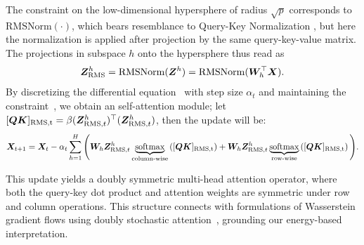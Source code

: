 The constraint on the low-dimensional hypersphere of radius $\sqrt{p}$ corresponds to $\operatorname{RMSNorm(\cdot)}$, which bears resemblance to Query-Key Normalization \citep{henry-etal-2020-query}, but here the normalization is applied after projection by the same query-key-value matrix. The projections in subspace $h$ onto the hypersphere thus read as 
\begin{equation}
\label{eq:7}
{\bm{Z}}_{\text{RMS}}^h = \operatorname{RMSNorm}({\bm{Z}}^h) = \operatorname{RMSNorm}({\bm{W}}_h^\top{\bm{X}}).
\end{equation}
By discretizing the differential equation~ with step size $\alpha_t$ and maintaining the constraint~, 
we obtain an self-attention module; let $[{\bm{Q}}{\bm{K}}]_{\text{RMS,t}}= \beta ({\bm{Z}}_{\text{RMS},t}^h)^\top ({\bm{Z}}_{\text{RMS},t}^h) $, then the update will be:
\begin{equation}
\label{eq:8}
{\bm{X}}_{t+1} ={\bm{X}}_{t} - \alpha_t \sum_{h=1}^H \Bigg( {\bm{W}}_h{\bm{Z}}_{\text{RMS},t}^h \underbrace{\operatorname{softmax}}_{\text{column-wise}} \left([{\bm{Q}}{\bm{K}}]_{\text{RMS,t}}\right) + {\bm{W}}_h{\bm{Z}}_{\text{RMS},t}^h \underbrace{\operatorname{softmax}}_{\text{row-wise}} \left( [{\bm{Q}}{\bm{K}}]_{\text{RMS,t}} \right) \Bigg).
\end{equation}

This update yields a doubly symmetric multi-head attention operator, where both the query-key dot product and attention weights are symmetric under row and column operations. This structure connects with formulations of Wasserstein gradient flows using doubly stochastic attention~\citep{pmlr-v151-sander22a}, grounding our energy-based interpretation. 

